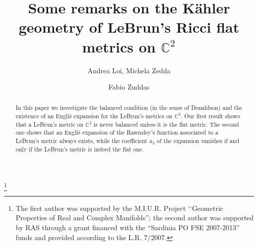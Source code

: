 \documentclass[11pt, reqno]{amsart}
\begin{document}
\title[Some remarks on LeBrun's Ricci flat metrics] {Some remarks on the  K\"{a}hler  geometry of LeBrun's Ricci  flat metrics  on ${\mathbb{C}}^2$}
\author[A. Loi, M. Zedda]{Andrea Loi, Michela Zedda}
\address{Dipartimento di Matematica e Informatica, Universit\`{a} di Cagliari,
Via Ospedale 72, 09124 Cagliari, Italy}
\author[F. Zuddas]{Fabio Zuddas}
\address{Dipartimento di Matematica, Parco Area delle Scienze 53/A  Parma (Italy)}

\thanks{
The first author was supported  by the M.I.U.R. Project \lq\lq Geometric
Properties of Real and Complex Manifolds'';
the second author was  supported by  RAS
through a grant financed with the ``Sardinia PO FSE 2007-2013'' funds and
provided according to the L.R. $7/2007$.}
\date{}

\begin{abstract}
In this paper we investigate the balanced condition (in the sense of Donaldson) and the existence of an Engli\v{s} expansion for the LeBrun's metrics on ${\mathbb{C}}^2$. Our first result shows  that a LeBrun's metric on ${\mathbb{C}}^2$ is never balanced unless it is the flat metric. The second one shows that an Engli\v{s} expansion of the Rawnsley's function associated to a LeBrun's metric always exists, while the coefficient $a_3$ of the expansion vanishes if and only if the LeBrun's metric is indeed the flat one.
\end{abstract}

\maketitle
\end{document}
